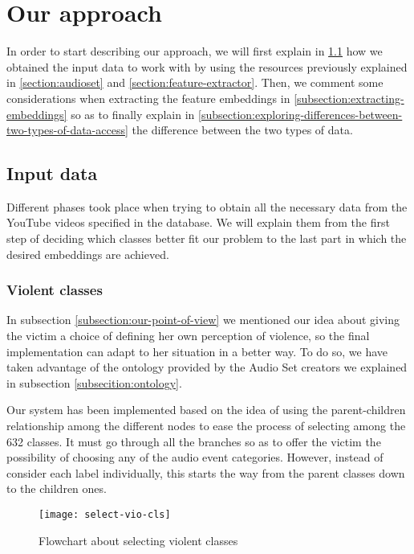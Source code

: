 \section{Our approach}
\label{section:our-approach}

	In order to start describing our approach, we will first explain in \ref{subsection:input-data} how we obtained the input data to work with by using the resources previously explained in \ref{section:audioset} and \ref{section:feature-extractor}. Then, we comment some considerations when extracting the feature embeddings in \ref{subsection:extracting-embeddings} so as to finally explain in \ref{subsection:exploring-differences-between-two-types-of-data-access} the difference between the two types of data.

\subsection{Input data}
\label{subsection:input-data}

	Different phases took place when trying to obtain all the necessary data from the YouTube videos specified in the database. We will explain them from the first step of deciding which classes better fit our problem to the last part in which the desired embeddings are achieved.

\subsubsection{Violent classes}
\label{subsection:violent-classes}

	In subsection \ref{subsection:our-point-of-view} we mentioned our idea about giving the victim a choice of defining her own perception of violence, so the final implementation can adapt to her situation in a better way. To do so, we have taken advantage of the ontology provided by the Audio Set creators we explained in subsection \ref{subsecition:ontology}. 

	Our system has been implemented based on the idea of using the parent-children relationship among the different nodes to ease the process of selecting among the 632 classes. It must go through all the branches so as to offer the victim the possibility of choosing any of the audio event categories. However, instead of consider each label individually, this starts the way from the parent classes down to the children ones.
	
	\begin{wrapfigure}[19]{R}[-18mm]{0.4\textwidth}
		\centering
		\captionsetup{justification=centering}
		\texttt{[image: select-vio-cls]}
		\caption{Flowchart about selecting violent classes}
		\label{fig:mesh3}
	\end{wrapfigure}
	
